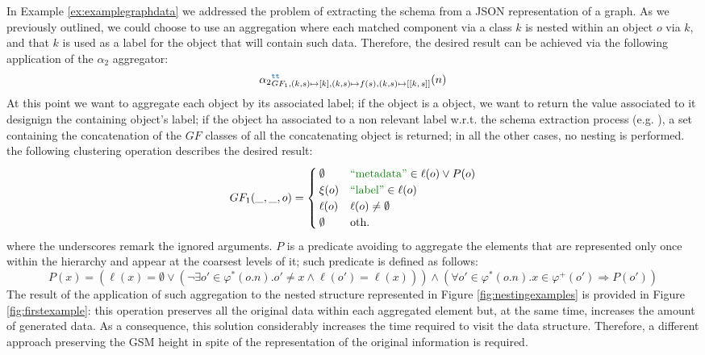 \begin{example}[label=ex:aggregations]
In Example \vref{ex:examplegraphdata} we addressed the problem of extracting the schema from a JSON representation of a graph. As we previously outlined, we could choose to use an aggregation where each matched component via a class $k$ is nested within an object $o$ via $k$, and that $k$ is used as a label for the object that will contain such data. Therefore, the desired result can be achieved via the following application of the $\alpha_2$ aggregator:
\[{\alpha_2}_{GF_1,(k,s)\mapsto [k], (k,s)\mapsto f(s), (k,s)\mapsto[[k,\, s]]}^{\texttt{\color{RoyalBlue}tt}}(n)\]
At this point we want to aggregate each object by its associated label; if the object is a  object, we want to return the value associated to it designign the containing object's label; if the object ha associated to a non relevant label w.r.t. the schema extraction process (e.g. ), a set containing the concatenation of the $GF$ classes of all the concatenating object is returned; in all the other cases, no nesting is performed. the following clustering operation describes the desired result:
\begin{equation}
\label{eq:GF1}
GF_1(\_, \_, o)=\begin{cases}
\emptyset & \mstr{metadata}\in\ell(o)\vee P(o)\\
\xi(o) & \mstr{label}\in\ell(o)\\
\ell(o) & \ell(o)\neq \emptyset\\
\emptyset & \textup{oth.}\\
\end{cases}
\end{equation}
where the underscores remark the ignored arguments.  $P$ is a predicate avoiding to aggregate the elements that are represented only once within the hierarchy and appear at the coarsest levels of it; such predicate is defined as follows:
\[P(x)=(\ell(x)=\emptyset\vee (\neg\exists o'\in\varphi^*(o.n). o'\neq x\wedge \ell(o')=\ell(x)))\wedge(\forall o'\in\varphi^*(o.n).x\in\varphi^+(o')\Rightarrow P(o'))\]
The result of the application of such aggregation to the nested structure represented in Figure \ref{fig:nestingexamples} is provided in Figure \ref{fig:firstexample}: this operation preserves all the original data within each aggregated element but, at the same time, increases the amount of generated data. As a consequence, this solution considerably increases the time required to visit the data structure. Therefore, a different approach preserving the GSM height in spite of the representation of the original information is required.
\end{example}

